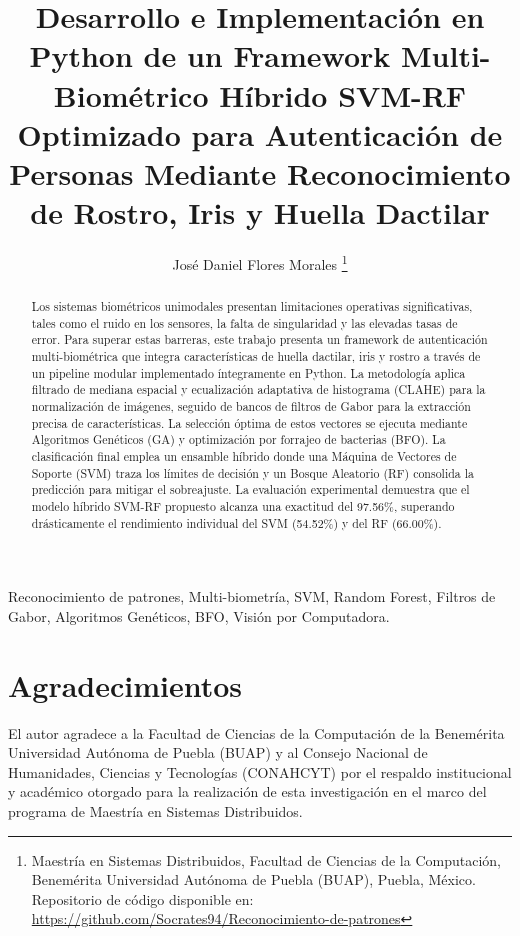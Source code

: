 \documentclass[twocolumn,twoside]{Jornadas}
\begin{document}
\title{Desarrollo e Implementación en Python de un Framework Multi-Biométrico Híbrido SVM-RF Optimizado para Autenticación de Personas Mediante Reconocimiento de Rostro, Iris y Huella Dactilar}

\author{%
     José Daniel Flores Morales%
     \thanks{Maestría en Sistemas Distribuidos, Facultad de Ciencias de la Computación, Benemérita Universidad Autónoma de Puebla (BUAP), Puebla, México. Repositorio de código disponible en: \url{https://github.com/Socrates94/Reconocimiento-de-patrones}}
}

\maketitle
\markboth{}{}
\pagestyle{empty} 
\thispagestyle{empty}

\begin{abstract}
Los sistemas biométricos unimodales presentan limitaciones operativas significativas, tales como el ruido en los sensores, la falta de singularidad y las elevadas tasas de error. Para superar estas barreras, este trabajo presenta un framework de autenticación multi-biométrica que integra características de huella dactilar, iris y rostro a través de un pipeline modular implementado íntegramente en Python. La metodología aplica filtrado de mediana espacial y ecualización adaptativa de histograma (CLAHE) para la normalización de imágenes, seguido de bancos de filtros de Gabor para la extracción precisa de características. La selección óptima de estos vectores se ejecuta mediante Algoritmos Genéticos (GA) y optimización por forrajeo de bacterias (BFO). La clasificación final emplea un ensamble híbrido donde una Máquina de Vectores de Soporte (SVM) traza los límites de decisión y un Bosque Aleatorio (RF) consolida la predicción para mitigar el sobreajuste. La evaluación experimental demuestra que el modelo híbrido SVM-RF propuesto alcanza una exactitud del 97.56\%, superando drásticamente el rendimiento individual del SVM (54.52\%) y del RF (66.00\%).
\end{abstract}

\begin{keywords}
Reconocimiento de patrones, Multi-biometría, SVM, Random Forest, Filtros de Gabor, Algoritmos Genéticos, BFO, Visión por Computadora.
\end{keywords}







\section*{Agradecimientos}
El autor agradece a la Facultad de Ciencias de la Computación de la Benemérita Universidad Autónoma de Puebla (BUAP) y al Consejo Nacional de Humanidades, Ciencias y Tecnologías (CONAHCYT) por el respaldo institucional y académico otorgado para la realización de esta investigación en el marco del programa de Maestría en Sistemas Distribuidos.

\nocite{*}


\end{document}
